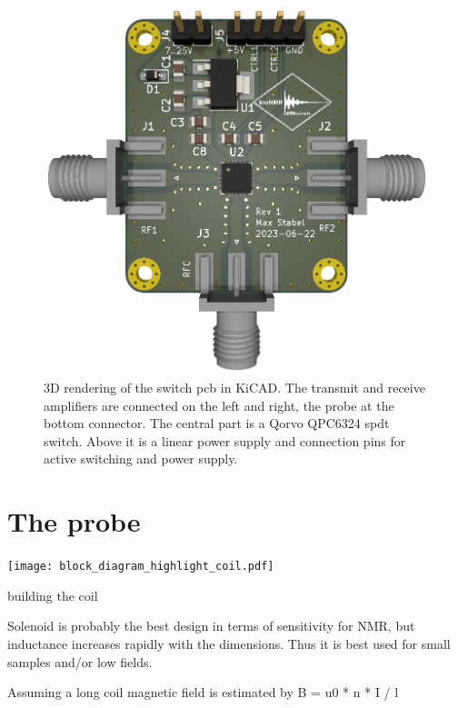 \begin{figure}[hbt]
    \centering
    \includegraphics{images/tr_switch.png}
    \caption{ 3D rendering of the switch \acrshort{pcb} in KiCAD. The transmit and receive amplifiers are connected on the left and right, the probe at the bottom connector. The central part is a Qorvo QPC6324 \acrfull{spdt} switch. Above it is a linear power supply and connection pins for active switching and power supply.}
\end{figure}


\section{The probe}
\begin{marginfigure}[-4.5\baselineskip]
    \texttt{[image: block\_diagram\_highlight\_coil.pdf]}
\end{marginfigure}
building the coil

Solenoid is probably the best design in terms of sensitivity for NMR, but inductance increases rapidly with the dimensions. Thus it is best used for small samples and/or low fields\cite{mispelterNMRProbeheadsBiophysical2015}.

Assuming a long coil magnetic field is estimated by
B = u0 * n * I / l \cite{mispelterNMRProbeheadsBiophysical2015}

